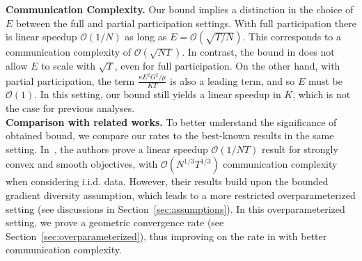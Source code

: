 \textbf{Communication Complexity.} Our bound implies a distinction
in the choice of $E$ between the full and partial participation settings.
With full participation there is linear speedup $\mathcal{O}(1/N)$
as long as $E=\mathcal{O}(\sqrt{T/N})$. This corresponds to a communication
complexity of $\mathcal{O}(\sqrt{NT})$. In contrast, the bound in
\cite{li2019convergence} does not allow $E$ to scale with $\sqrt{T}$,
even for full participation. On the other hand, with partial participation,
the term $\frac{\kappa E^{2}G^{2}/\mu}{KT}$ is also a leading term,
and so $E$ must be $\mathcal{O}(1)$. In this setting, our bound
still yields a linear speedup in $K$, which is not the case for previous
analyses. \\
\textbf{Comparison with related works.} To better understand the significance of obtained bound, we compare 
our rates to the best-known results in the same setting. 
In~\cite{haddadpour2019convergence}, the authors prove a linear speedup $\mathcal{O}(1/NT)$ result for strongly
convex and smooth objectives, with $\mathcal{O}(N^{1/3}T^{1/3})$ communication complexity when considering i.i.d. data. 
However, their results build upon the bounded gradient diversity assumption, which leads to a more restricted overparameterized setting (see discussions in Section~\ref{sec:assumptions}). In this overparameterized setting, we prove a geometric convergence rate (see Section~\ref{sec:overparameterized}), 
thus improving on the rate in \cite{haddadpour2019convergence} with
better communication complexity. 

